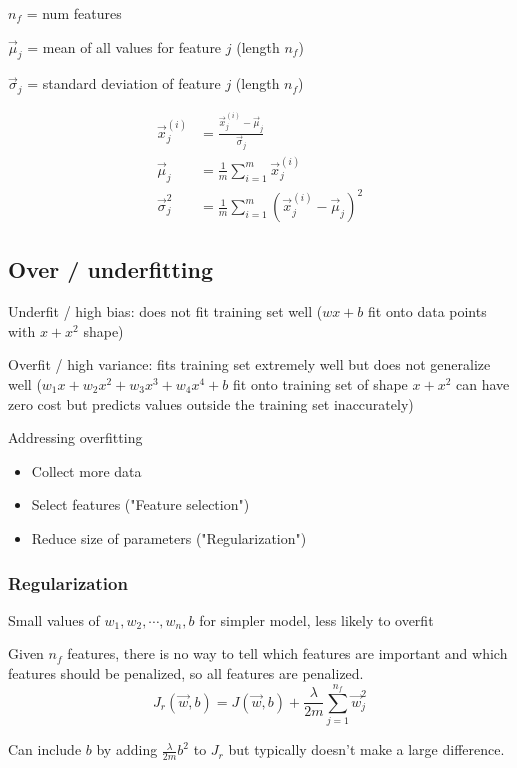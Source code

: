 \documentclass[12pt]{article}
\begin{document}
$n_f$ = num features

$\vec{\mu}_j$ = mean of all values for feature $j$ (length $n_f$)

$\vec{\sigma}_j$ = standard deviation of feature $j$ (length $n_f$)

\begin{align*}
    \vec{x}^{(i)}_j &= \frac{\vec{x}^{(i)}_j - \vec{\mu}_j}{\vec{\sigma}_j}\\
    \vec{\mu}_j &= \frac{1}{m} \sum_{i=1}^{m} \vec x^{(i)}_j\\
    \vec{\sigma}_j^2 &= \frac{1}{m} \sum_{i=1}^{m} (\vec x^{(i)}_j - \vec{\mu}_j)^2
\end{align*}

\subsection{Over / underfitting}

Underfit / high bias: does not fit training set well ($wx + b$ fit onto data points with $x + x^2$ shape)

Overfit / high variance: fits training set extremely well but does not generalize well ($w_1 x + w_2 x^2 + w_3 x^3 + w_4 x^4 + b$ fit onto training set of shape $x + x^2$ can have zero cost but predicts values outside the training set inaccurately)

\vspace{5px}

Addressing overfitting
\begin{itemize}
	\item Collect more data
	\item Select features ("Feature selection")
	\item Reduce size of parameters ("Regularization")
\end{itemize}

\subsubsection{Regularization}

Small values of $w_1,w_2,\cdots,w_n,b$ for simpler model, less likely to overfit

Given $n_f$ features, there is no way to tell which features are important and which features should be penalized, so all features are penalized.
\[ J_r(\vec{w},b) = J(\vec{w},b) + \frac{\lambda}{2m} \sum_{j=1}^{n_f} \vec{w}_j^2 \]

Can include $b$ by adding $\frac{\lambda}{2m} b^2$ to $J_r$ but typically doesn't make a large difference.
\end{document}
